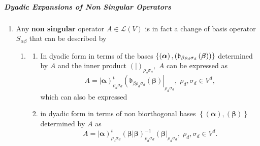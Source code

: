 \documentclass[aps,preprint]{revtex4}
\begin{document}
\subparagraph{Dyadic Expansions of Non Singular Operators \label{Dyadic
Expansions of Non Singular Operators}}

\begin{enumerate}
\item Any \textbf{non singular} operator $A\in \mathcal{L}\left( V\right) $
is in fact a change of basis operator $S_{\alpha \beta }$ that can be
described by

\begin{enumerate}
\item 
\begin{enumerate}
\item In dyadic form in terms of the bases $\left\{ \left( \boldsymbol{%
\alpha }\right) ,\left( \mathfrak{b}_{\beta \rho _{d}\sigma _{d}}\left( 
\boldsymbol{\beta }\right) \right) \right\} $ determined by $A$ and the
inner product $\left( \left. {}\right\vert \right) _{\rho _{d}\sigma _{d}},$ 
$A$ can be expressed as 
\begin{equation}
A=\left\vert \boldsymbol{\alpha }\right) _{\rho _{d}\sigma _{d}}^{t}\left( 
\mathfrak{b}_{\beta \rho _{d}\sigma _{d}}\left( \boldsymbol{\beta }\right)
\right\vert _{\rho _{d}\sigma _{d}},\;\rho _{d},\sigma _{d}\in V^{d},
\end{equation}%
which can also be expressed

\item in dyadic form in terms of non biorthogonal bases $\left\{ \left( 
\boldsymbol{\alpha }\right) ,\left( \boldsymbol{\beta }\right) \right\} $
determined by $A$ as 
\begin{equation}
A=\left\vert \boldsymbol{\alpha }\right) _{\rho _{d}\sigma _{d}}^{t}\left(
\left. \boldsymbol{\beta }\right\vert \boldsymbol{\beta }\right) _{\rho
_{d}\sigma _{d}}^{-1}\left( \boldsymbol{\beta }\right\vert _{\rho _{d}\sigma
_{d}},\;\rho _{d},\sigma _{d}\in V^{d}.
\end{equation}


\end{enumerate}
\end{enumerate}
\end{enumerate}
\end{document}
